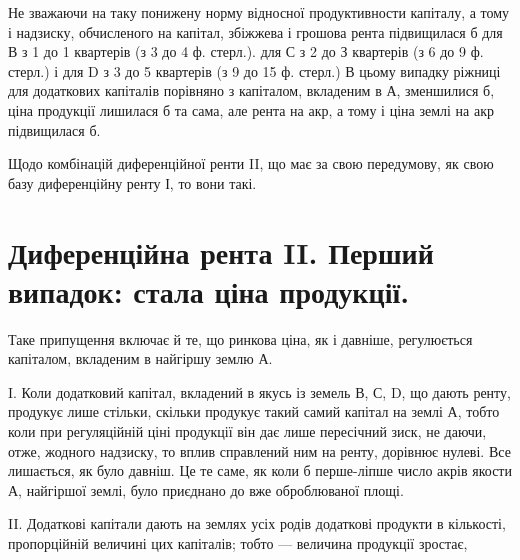 Не зважаючи на таку понижену норму відносної продуктивности капіталу,
а тому і надзиску, обчисленого на капітал, збіжжева і грошова рента підвищилася
б для В з 1 до 1 квартерів (з 3 до 4 ф. стерл.). для С з 2 до
З квартерів (з 6 до 9 ф. стерл.) і для D з 3 до 5 квартерів (з 9 до 15 ф. стерл.)
В цьому випадку ріжниці для додаткових капіталів порівняно з капіталом,
вкладеним в А, зменшилися б, ціна продукції лишилася б та сама, але рента
на акр, а тому і ціна землі на акр підвищилася б.

Щодо комбінацій диференційної ренти II, що має за свою передумову, як
свою базу диференційну ренту І, то вони такі.

\section{Диференційна рента II. Перший випадок: стала ціна продукції.}

Таке припущення включає й те, що ринкова ціна, як і давніше, регулюється
капіталом, вкладеним в найгіршу землю А.

I. Коли додатковий капітал, вкладений в якусь із земель В, С, D, що
дають ренту, продукує лише стільки, скільки продукує такий самий капітал на
землі А, тобто коли при регуляційній ціні продукції він дає лише пересічний
зиск, не даючи, отже, жодного надзиску, то вплив справлений ним на ренту, дорівнює
нулеві. Все лишається, як було давніш. Це те саме, як коли б перше-ліпше
число акрів якости А, найгіршої землі, було приєднано до вже оброблюваної
площі.

II. Додаткові капітали дають на землях усіх родів додаткові продукти в кількості,
пропорційній величині цих капіталів; тобто — величина продукції зростає,
\parbreak{}  %
